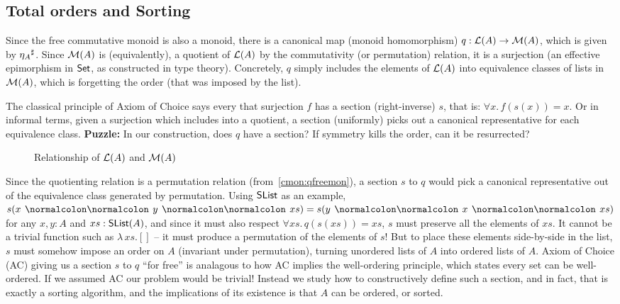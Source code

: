 
\subsection{Total orders and Sorting}
\label{sec:sorting}

Since the free commutative monoid is also a monoid, there is a canonical map (monoid homomorphism)
$q : \mathcal{L}(A) \to \mathcal{M}(A)$, which is given by ${\eta_A}^{\sharp}$.
%
Since $\mathcal{M}(A)$ is (equivalently), a quotient of $\mathcal{L}(A)$ by the commutativity (or permutation) relation,
it is a surjection (an effective epimorphism in $\mathsf{Set}$, as constructed in type theory).
%
Concretely, $q$ simply includes the elements of $\mathcal{L}(A)$ into equivalence classes of lists in $\mathcal{M}(A)$,
which is forgetting the order (that was imposed by the list).

The classical principle of Axiom of Choice says every that surjection $f$ has a section (right-inverse) $s$, that is:
$\forall x.\, f(s(x)) = x$. Or in informal terms, given a surjection which includes into a quotient, a section
(uniformly) picks out a canonical representative for each equivalence class.
%
\textbf{Puzzle:} In our construction, does $q$ have a section? If symmetry kills the order, can it be resurrected?

\begin{figure}[H]
    \centering
    \caption{Relationship of $\mathcal{L}(A)$ and $\mathcal{M}(A)$}
    \label{fig:enter-label}
\end{figure}

Since the quotienting relation is a permutation relation (from~\cref{cmon:qfreemon}), a section $s$ to $q$ would pick a
canonical representative out of the equivalence class generated by permutation.
%
Using $\operatorname{\mathsf{SList}}$ as an example, $s(x \cons y \cons xs) = s(y \cons x \cons xs)$ for any $x, y : A$ and $xs : \operatorname{\mathsf{SList}}(A)$,
and since it must also respect $\forall xs.\,q(s(xs)) = xs$, $s$ must preserve all the elements of $xs$.
It cannot be a trivial function such as $\lambda\,xs. []$ -- it must produce a permutation of the elements of $s$!
%
But to place these elements side-by-side in the list, $s$ must somehow impose an order on $A$
(invariant under permutation), turning unordered lists of $A$ into ordered lists of $A$.
%
Axiom of Choice (AC) giving us a section $s$ to $q$ ``for free'' is analagous to how
AC implies the well-ordering principle, which states every set can be well-ordered.
%
If we assumed AC our problem would be trivial!
%
Instead we study how to constructively define such a section, and in fact, that is exactly a sorting algorithm,
and the implications of its existence is that $A$ can be ordered, or sorted.

